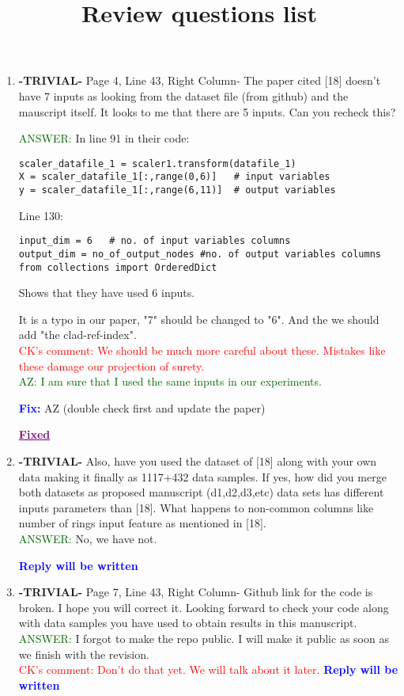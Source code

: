 \documentclass{article}
\title{Review questions list}
\newcommand{\fix}{\large \textcolor{blue}{ \textbf{Fix:} }}
\newcommand{\fixed}{\Large \textcolor{purple}{ \underline{\textbf{Fixed}} }}
\newcommand{\reply}{\large \textcolor{blue}{ \textbf{Reply will be written} }}
\begin{document}
\begin{enumerate}
	\item \textbf{-TRIVIAL-} Page 4, Line 43, Right Column- The paper cited [18] doesn't have 7 inputs as looking from the dataset file (from github) and the mauscript itself. It looks to me that there are 5 inputs. Can you recheck this?

\textcolor{darkgreen}{ANSWER: } In line 91 in their code:
\begin{verbatim}
scaler_datafile_1 = scaler1.transform(datafile_1) 
X = scaler_datafile_1[:,range(0,6)]   # input variables
y = scaler_datafile_1[:,range(6,11)]  # output variables

\end{verbatim}

Line 130:
\begin{verbatim}
input_dim = 6   # no. of input variables columns
output_dim = no_of_output_nodes #no. of output variables columns
from collections import OrderedDict
\end{verbatim}

Shows that they have used 6 inputs.

It is a typo in our paper, "7" should be changed to "6". And the we should add "the clad-ref-index".	\\
\textcolor{red}{ CK's comment: We should be much more careful about these. Mistakes like these damage our projection of surety.}\\

\textcolor{darkgreen}{ AZ: I am sure that I used the same inputs in our experiments.}

\fix AZ (double check first and update the paper)

\fixed

	
	\item \textbf{-TRIVIAL-} Also, have you used the dataset of [18] along with your own data making it finally as 1117+432 data samples. If yes, how did you merge both datasets as proposed manuscript (d1,d2,d3,etc) data sets has different inputs parameters than [18]. What happens to non-common columns like number of rings input feature as mentioned in [18].     \\
	\textcolor{darkgreen}{ANSWER: } No, we have not. 
	
	\reply
		
		
\item \textbf{-TRIVIAL-} Page 7, Line 43, Right Column- Github link for the code is broken. I hope you will correct it. Looking forward to check your code along with data samples you have used  to obtain results in this manuscript. \\
\textcolor{darkgreen}{ANSWER: } I forgot to make the repo public. I will make it public as soon as we finish with the revision. \\ 
\textcolor{red}{ CK's comment: Don't do that yet. We will talk about it later.}
\reply
    

\end{enumerate}
\end{document}
